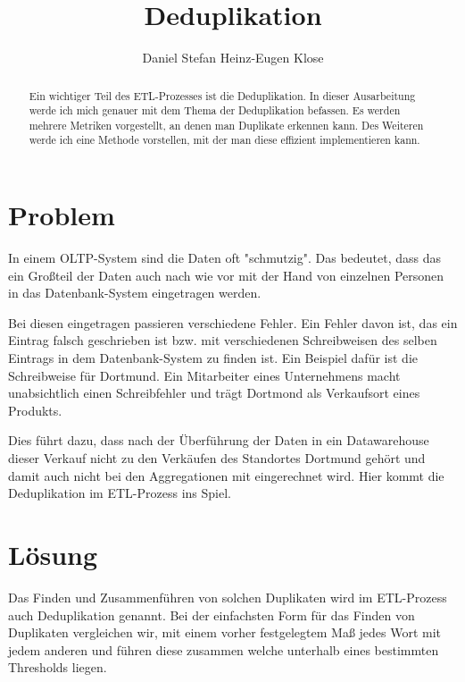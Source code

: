\documentclass[sigconf]{acmart}
\begin{document}
\title{Deduplikation}

\author{Daniel Stefan Heinz-Eugen Klose}


\begin{abstract}
  Ein wichtiger Teil des ETL-Prozesses ist die Deduplikation.
  In dieser Ausarbeitung werde ich mich genauer mit dem Thema
  der Deduplikation
  befassen. Es werden mehrere Metriken vorgestellt, an denen
  man Duplikate erkennen kann.
  Des Weiteren werde ich eine Methode vorstellen, mit der man
  diese effizient implementieren kann.

\end{abstract}

\maketitle

\section*{Problem}
In einem OLTP-System sind die Daten oft "schmutzig". Das bedeutet, 
dass das ein Großteil der Daten auch nach wie vor mit der Hand von
einzelnen Personen in das Datenbank-System eingetragen werden. 

Bei diesen eingetragen
passieren verschiedene Fehler. Ein Fehler davon ist, das ein Eintrag 
falsch geschrieben ist bzw. mit verschiedenen Schreibweisen des
selben Eintrags in dem 
Datenbank-System zu finden ist. Ein Beispiel dafür ist die 
Schreibweise für Dortmund. Ein Mitarbeiter eines Unternehmens 
macht unabsichtlich einen Schreibfehler und trägt Dortmond als 
Verkaufsort eines Produkts.

Dies führt dazu, dass nach der Überführung der Daten in ein
Datawarehouse dieser Verkauf nicht zu den Verkäufen des Standortes 
Dortmund gehört und damit auch nicht bei den Aggregationen mit 
eingerechnet wird. Hier kommt die Deduplikation im ETL-Prozess 
ins Spiel.

\section*{Lösung}
Das Finden und Zusammenführen von solchen Duplikaten wird im 
ETL-Prozess auch Deduplikation genannt. Bei der einfachsten Form 
für das Finden von Duplikaten vergleichen wir, mit einem vorher 
festgelegtem Maß jedes Wort mit jedem anderen und führen diese 
zusammen welche unterhalb eines bestimmten Thresholds liegen.
\end{document}
